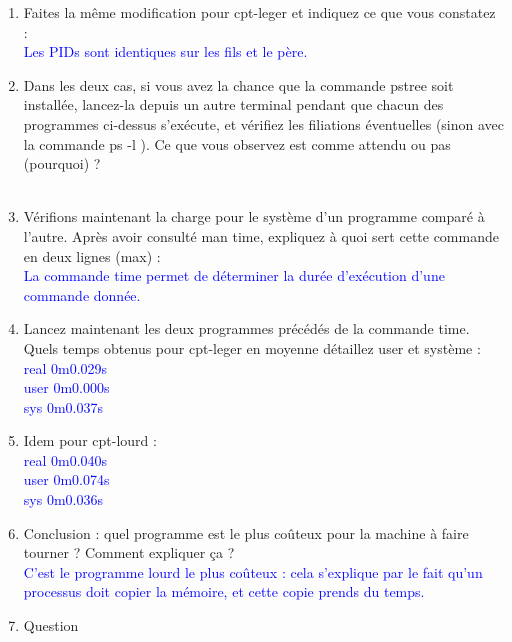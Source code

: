 \documentclass{article}
\begin{document}
\begin{enumerate}
		\item Faites la même modification pour cpt-leger et indiquez ce que vous constatez : \\
			\textcolor{blue}{Les PIDs sont identiques sur les fils et le père.}\\
		\item Dans les deux cas, si vous avez la chance que la commande pstree soit installée,
		lancez-la depuis un autre terminal pendant que chacun des programmes ci-dessus
		s’exécute, et vérifiez les filiations éventuelles (sinon avec la commande ps -l ). Ce
		que vous observez est comme attendu ou pas (pourquoi) ? \\
			\textcolor{blue}{}\\
		\item Vérifions maintenant la charge pour le système d’un programme comparé à l’autre.
		Après avoir consulté man time, expliquez à quoi sert cette commande en deux lignes
		(max) : \\
			\textcolor{blue}{La commande time permet de déterminer la durée d'exécution d'une commande donnée.}\\
		\item Lancez maintenant les deux programmes précédés de la commande time. Quels
		temps obtenus pour cpt-leger en moyenne détaillez user et système : \\
			\textcolor{blue}{real    0m0.029s \\
				user    0m0.000s \\
				sys     0m0.037s}\\
		\item Idem pour cpt-lourd : \\
			\textcolor{blue}{real    0m0.040s \\
				user    0m0.074s \\
				sys     0m0.036s}\\
		\item Conclusion : quel programme est le plus coûteux pour la machine à faire tourner ?
		Comment expliquer ça ? \\
			\textcolor{blue}{C'est le programme lourd le plus coûteux : cela s'explique par le fait qu'un processus doit copier la mémoire, et cette copie prends du temps.}\\
		\item Question \\
			\textcolor{blue}{}\\
			
	\end{enumerate}
\end{document}
